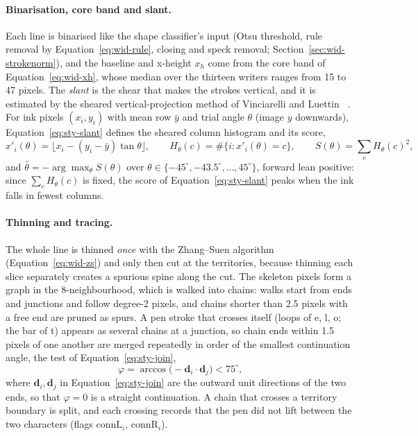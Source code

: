 \paragraph{Binarisation, core band and slant.}
Each line is binarised like the shape classifier's input (Otsu threshold, rule removal by Equation~\ref{eq:wid-rule}, closing and speck removal; Section~\ref{sec:wid-strokenorm}), and the baseline and x-height $x_h$ come from the core band of Equation~\ref{eq:wid-xh}, whose median over the thirteen writers ranges from 15 to 47 pixels.
The \emph{slant} is the shear that makes the strokes vertical, and it is estimated by the sheared vertical-projection method of Vinciarelli and Luettin~\cite{vinciarelli2001} .
For ink pixels $(x_i,y_i)$ with mean row $\bar y$ and trial angle $\theta$ (image $y$ downwards), Equation~\ref{eq:sty-slant} defines the sheared column histogram and its score,
\begin{equation}
x'_i(\theta)=\bigl\lfloor x_i-(y_i-\bar y)\tan\theta\bigr\rfloor,\qquad H_\theta(c)=\#\{i:x'_i(\theta)=c\},\qquad S(\theta)=\sum_cH_\theta(c)^2 ,
\label{eq:sty-slant}
\end{equation}
and $\hat\theta=-\arg\max_\theta S(\theta)$ over $\theta\in\{-45^\circ,-43.5^\circ,\ldots,45^\circ\}$, forward lean positive: since $\sum_cH_\theta(c)$ is fixed, the score of Equation~\ref{eq:sty-slant} peaks when the ink falls in fewest columns.

\paragraph{Thinning and tracing.}
The whole line is thinned \emph{once} with the Zhang--Suen algorithm~\cite{zhang1984} (Equation~\ref{eq:wid-zs}) and only then cut at the territories, because thinning each slice separately creates a spurious spine along the cut.
The skeleton pixels form a graph in the 8-neighbourhood, which is walked into chains: walks start from ends and junctions and follow degree-2 pixels, and chains shorter than 2.5 pixels with a free end are pruned as spurs.
A pen stroke that crosses itself (loops of e, l, o; the bar of t) appears as several chains at a junction, so chain ends within 1.5 pixels of one another are merged repeatedly in order of the smallest continuation angle, the test of Equation~\ref{eq:sty-join},
\begin{equation}
\varphi=\arccos\bigl(-\mathbf d_i\cdot\mathbf d_j\bigr)<75^\circ,
\label{eq:sty-join}
\end{equation}
where $\mathbf d_i,\mathbf d_j$ in Equation~\ref{eq:sty-join} are the outward unit directions of the two ends, so that $\varphi=0$ is a straight continuation.
A chain that crosses a territory boundary is split, and each crossing records that the pen did not lift between the two characters (flags $\mathrm{connL}_i$, $\mathrm{connR}_i$).


